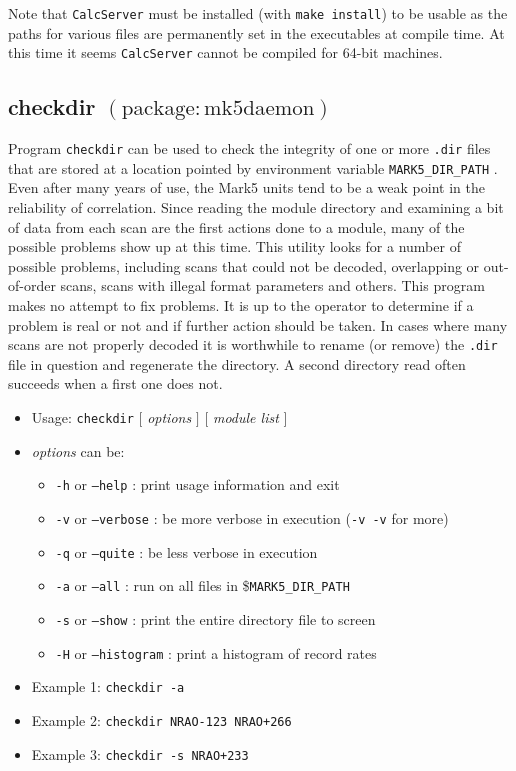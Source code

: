 \noindent
Note that {\tt CalcServer} must be installed (with {\tt make install}) to be usable as the paths for various files are permanently set in the executables at compile time.
At this time it seems {\tt CalcServer} cannot be compiled for 64-bit machines.








\subsection{checkdir {\small $\mathrm{(package: mk5daemon)}$}}

Program {\tt checkdir} can be used to check the integrity of one or more {\tt .dir} files that are stored at a location pointed by environment variable {\tt MARK5\_DIR\_PATH} .
Even after many years of use, the Mark5 units tend to be a weak point in the reliability of correlation.
Since reading the module directory and examining a bit of data from each scan are the first actions done to a module, many of the possible problems show up at this time.
This utility looks for a number of possible problems, including scans that could not be decoded, overlapping or out-of-order scans, scans with illegal format parameters and others.
This program makes no attempt to fix problems.
It is up to the operator to determine if a problem is real or not and if further action should be taken.
In cases where many scans are not properly decoded it is worthwhile to rename (or remove) the {\tt .dir} file in question and regenerate the directory.  
A second directory read often succeeds when a first one does not.

\begin{itemize}
\item[] Usage: {\tt checkdir} $[$ {\em options} $]$ $[$ {\em module list} $]$
\item[] {\em options} can be:
\begin{itemize}
\item[] {\tt -h} or {\tt --help} : print usage information and exit
\item[] {\tt -v} or {\tt --verbose} : be more verbose in execution ({\tt -v -v} for more)
\item[] {\tt -q} or {\tt --quite} : be less verbose in execution
\item[] {\tt -a} or {\tt --all} : run on all files in \${\tt MARK5\_DIR\_PATH} 
\item[] {\tt -s} or {\tt --show} : print the entire directory file to screen
\item[] {\tt -H} or {\tt --histogram} : print a histogram of record rates
\end{itemize}
\item[] Example 1: {\tt checkdir -a}
\item[] Example 2: {\tt checkdir NRAO-123 NRAO+266}
\item[] Example 3: {\tt checkdir -s NRAO+233}
\end{itemize}

